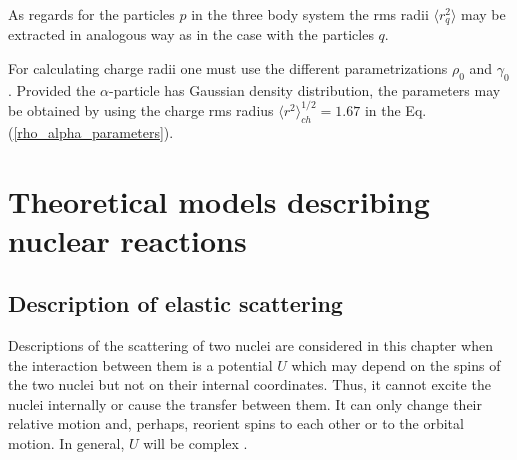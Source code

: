 \documentclass[
12pt, %
oneside, %
english, %
onehalfspacing, %
onehalfspacing, %
headsepline, %
]{MastersDoctoralThesis} %
\begin{document}
As regards for the particles $p$ in the three body system the rms radii $\langle r_q^2 \rangle$ may be extracted in analogous way as in the case with the particles $q$. 

For calculating charge radii one must use the different parametrizations $\rho_0$ and $\gamma_0$. Provided the $\alpha$-particle has Gaussian density distribution, the parameters may be obtained by using the charge rms radius $\langle r^2 \rangle^{1/2}_{ch}=1.67$ \cite{satchler1979folding} in the Eq. (\ref{rho_alpha_parameters}).

\chapter{Theoretical models describing nuclear reactions} %

\label{Chapter2} %


\section{Description of elastic scattering}
Descriptions of the scattering of two nuclei are considered in this chapter when the interaction between them is a potential $U$ which may depend on the spins of the two nuclei but not on their internal coordinates. Thus, it cannot excite the nuclei internally or cause the transfer between them. It can only change their relative motion and, perhaps, reorient spins to each other or to the orbital motion. In general, $U$ will be complex \cite{satchler1983}. 
\end{document}
